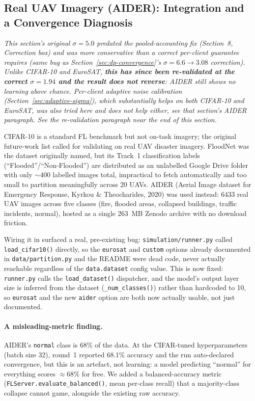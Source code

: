 \documentclass[12pt,a4paper]{article}
\begin{document}
\subsection{Real UAV Imagery (AIDER): Integration and a Convergence Diagnosis}
\label{sec:aider}

\emph{This section's original $\sigma=5.0$ predated the pooled-accounting
fix (Section~8, Correction box) and was more conservative than a correct
per-client guarantee requires (same bug as Section~\ref{sec:dp-convergence}'s
$\sigma=6.6\to3.08$ correction). Unlike CIFAR-10 and EuroSAT, \textbf{this
has since been re-validated at the correct $\sigma=1.94$ and the result
does not reverse}: AIDER still shows no learning above chance. Per-client
adaptive noise calibration (Section~\ref{sec:adaptive-sigma}), which
substantially helps on both CIFAR-10 and EuroSAT, was also tried here and
does \emph{not} help either, see that section's AIDER paragraph. See the
re-validation paragraph near the end of this section.}

CIFAR-10 is a standard FL benchmark but not on-task imagery; the original
future-work list called for validating on real UAV disaster imagery. FloodNet
was the dataset originally named, but its Track~1 classification labels
(``Flooded''/``Non-Flooded'') are distributed as an unlabelled Google Drive
folder with only $\sim$400 labelled images total, impractical to fetch
automatically and too small to partition meaningfully across 20 UAVs. AIDER
(Aerial Image dataset for Emergency Response, Kyrkou \& Theocharides, 2020)
was used instead: 6433 real UAV images across five classes (fire, flooded
areas, collapsed buildings, traffic incidents, normal), hosted as a single
263~MB Zenodo archive with no download friction.

Wiring it in surfaced a real, pre-existing bug: \texttt{simulation/runner.py}
called \texttt{load\_cifar10()} directly, so the \texttt{eurosat} and
\texttt{custom} options already documented in \texttt{data/partition.py} and
the README were dead code, never actually reachable regardless of the
\texttt{data.dataset} config value. This is now fixed: \texttt{runner.py}
calls the \texttt{load\_dataset()} dispatcher, and the model's output layer
size is inferred from the dataset (\texttt{\_num\_classes()}) rather than
hardcoded to 10, so \texttt{eurosat} and the new \texttt{aider} option are
both now actually usable, not just documented.

\paragraph{A misleading-metric finding.} AIDER's \texttt{normal} class is
68\% of the data. At the CIFAR-tuned hyperparameters (batch size 32), round~1
reported 68.1\% accuracy and the run auto-declared convergence, but this
is an artefact, not learning: a model predicting ``normal'' for everything
scores $\approx$68\% for free. We added a balanced-accuracy metric
(\texttt{FLServer.evaluate\_balanced()}, mean per-class recall) that a
majority-class collapse cannot game, alongside the existing raw accuracy.
\end{document}
